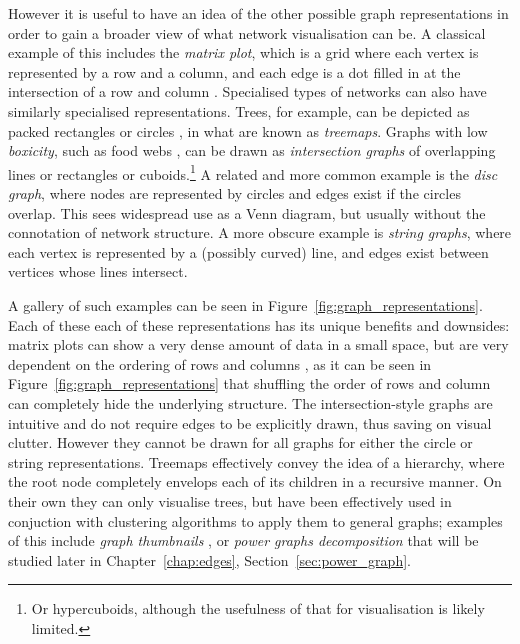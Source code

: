 However it is useful to have an idea of the other possible graph representations in order to gain a broader view of what network visualisation can be. A classical example of this includes the \emph{matrix plot}, which is a grid where each vertex is represented by a row and a column, and each edge is a dot filled in at the intersection of a row and column \cite{Liiv2010}.
Specialised types of networks can also have similarly specialised representations. Trees, for example, can be depicted as packed rectangles \cite{Johnson1991} or circles \cite{Wang2006}, in what are known as \emph{treemaps}.
Graphs with low \emph{boxicity}, such as food webs \cite{Eklof2013}, can be drawn as \emph{intersection graphs} of overlapping lines or rectangles or cuboids.\footnote{Or hypercuboids, although the usefulness of that for visualisation is likely limited.}
A related and more common example is the \emph{disc graph}, where nodes are represented by circles and edges exist if the circles overlap. This sees widespread use as a Venn diagram, but usually without the connotation of network structure.
A more obscure example is \emph{string graphs}, where each vertex is represented by a (possibly curved) line, and edges exist between vertices whose lines intersect.

A gallery of such examples can be seen in Figure~\ref{fig:graph_representations}.
Each of these each of these representations has its unique benefits and downsides: matrix plots can show a very dense amount of data in a small space, but are very dependent on the ordering of rows and columns \cite{Liiv2010}, as it can be seen in Figure~\ref{fig:graph_representations} that shuffling the order of rows and column can completely hide the underlying structure.
The intersection-style graphs are intuitive and do not require edges to be explicitly drawn, thus saving on visual clutter. However they cannot be drawn for all graphs for either the circle \cite{McDiarmid2014} or string \cite{Schaefer2003} representations.
Treemaps effectively convey the idea of a hierarchy, where the root node completely envelops each of its children in a recursive manner. On their own they can only visualise trees, but have been effectively used in conjuction with clustering algorithms to apply them to general graphs; examples of this include \emph{graph thumbnails} \cite{Yoghourdjian2018}, or \emph{power graphs decomposition} \cite{Dwyer2014} that will be studied later in Chapter~\ref{chap:edges}, Section~\ref{sec:power_graph}.
  

